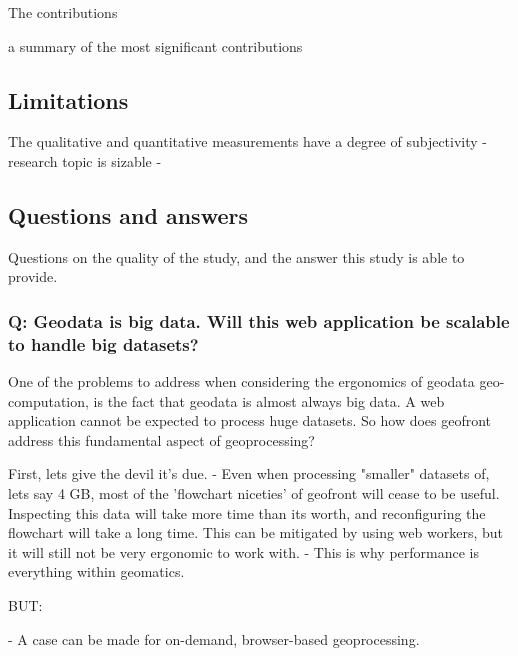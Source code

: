 The contributions

a summary of the most significant contributions





\subsection{Limitations}
\label{sec:limitations}


The qualitative and quantitative measurements have a degree of subjectivity
- research topic is sizable
- 



\subsection*{Questions and answers}
Questions on the quality of the study, and the answer this study is able to provide.

\subsubsection*{Q: Geodata is big data. Will this web application be scalable to handle big datasets?}

One of the problems to address when considering the ergonomics of geodata geo-computation, is the fact that geodata is almost always big data. A web application cannot be expected to process huge datasets. So how does geofront address this fundamental aspect of geoprocessing? 

First, lets give the devil it's due. 
- Even when processing "smaller" datasets of, lets say 4 GB, most of the 'flowchart niceties' of geofront will cease to be useful. Inspecting this data will take more time than its worth, and reconfiguring the flowchart will take a long time. This can be mitigated by using web workers, but it will still not be very ergonomic to work with. 
- This is why performance is everything within geomatics.

BUT: 

- A case can be made for on-demand, browser-based geoprocessing. 

